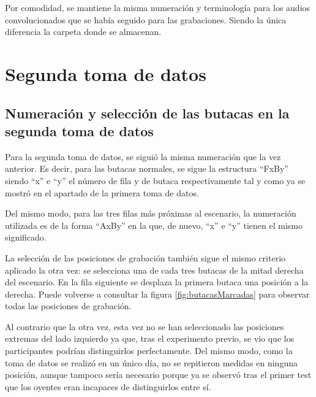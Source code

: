 \documentclass[11pt,a4paper,twoside]{book}
\begin{document}
                Por comodidad, se mantiene la misma numeración y terminología para los audios convolucionados que se había seguido para las grabaciones. Siendo la única diferencia la carpeta donde se almacenan.
            
    \section{Segunda toma de datos}
        
       \subsection{Numeración y selección de las butacas en la segunda toma de datos}
            Para la segunda toma de datos, se siguió la misma numeración que la vez anterior. Es decir, para las butacas normales, se sigue la estructura ``FxBy'' siendo ``x'' e ``y'' el número de fila y de butaca respectivamente tal y como ya se mostró en el apartado de la primera toma de datos.
                
            Del mismo modo, para las tres filas más próximas al escenario, la numeración utilizada es de la forma ``AxBy'' en la que, de nuevo, ``x'' e ``y'' tienen el mismo significado.\newline
                
            La selección de las posiciones de grabación también sigue el mismo criterio aplicado la otra vez: se selecciona una de cada tres butacas de la mitad derecha del escenario. En la fila siguiente se desplaza la primera butaca una posición a la derecha. Puede volverse a consultar la figura \ref{fig:butacasMarcadas} para observar todas las posiciones de grabación.
                
            Al contrario que la otra vez, esta vez no se han seleccionado las posiciones extremas del lado izquierdo ya que, tras el experimento previo, se vio que los participantes podrían distinguirlos perfectamente. Del mismo modo, como la toma de datos se realizó en un único día, no se repitieron medidas en ninguna posición, aunque tampoco sería necesario porque ya se observó tras el primer test que los oyentes eran incapaces de distinguirlos entre sí.
                
                
\end{document}
